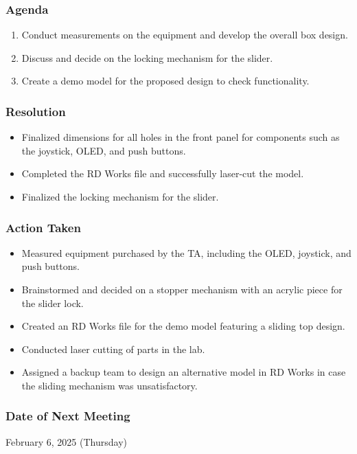 \documentclass[12pt,a4paper]{article}
\begin{document}
\subsubsection*{Agenda}
\begin{enumerate}
    \item Conduct measurements on the equipment and develop the overall box design.
    \item Discuss and decide on the locking mechanism for the slider.
    \item Create a demo model for the proposed design to check functionality.
\end{enumerate}

\subsubsection*{Resolution}
\begin{itemize}
    \item Finalized dimensions for all holes in the front panel for components such as the joystick, OLED, and push buttons.
    \item Completed the RD Works file and successfully laser-cut the model.
    \item Finalized the locking mechanism for the slider.
\end{itemize}

\subsubsection*{Action Taken}
\begin{itemize}
    \item Measured equipment purchased by the TA, including the OLED, joystick, and push buttons.
    \item Brainstormed and decided on a stopper mechanism with an acrylic piece for the slider lock.
    \item Created an RD Works file for the demo model featuring a sliding top design.
    \item Conducted laser cutting of parts in the lab.
    \item Assigned a backup team to design an alternative model in RD Works in case the sliding mechanism was unsatisfactory.
\end{itemize}

\subsubsection*{Date of Next Meeting}
February 6, 2025 (Thursday) 
\end{document}
